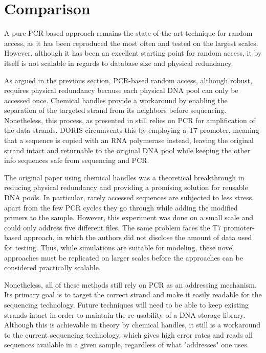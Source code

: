 \documentclass[a4paper,conference]{IEEEtran}
\begin{document}
\section{Comparison}
A pure PCR-based approach remains the state-of-the-art technique for random access, as it has been reproduced the most often and tested on the largest scales. However, although it has been an excellent starting point for random access, it by itself is not scalable in regards to database size and physical redundancy. 

As argued in the previous section, PCR-based random access, although robust, requires physical redundancy because each physical DNA pool can only be accessed once. Chemical handles provide a workaround by enabling the separation of the targeted strand from its neighbors before sequencing. Nonetheless, this process, as presented in \cite{chemicalhandles} still relies on PCR for amplification of the data strands. DORIS circumvents this by employing a T7 promoter, meaning that a sequence is copied with an RNA polymerase instead, leaving the original strand intact and returnable to the original DNA pool while keeping the other info sequences safe from sequencing and PCR.

The original paper using chemical handles was a theoretical breakthrough in reducing physical redundancy and providing a promising solution for reusable DNA pools. In particular, rarely accessed sequences are subjected to less stress, apart from the few PCR cycles they go through while adding the modified primers to the sample. However, this experiment was done on a small scale and could only address five different files. The same problem faces the T7 promoter-based approach, in which the authors did not disclose the amount of data used for testing. Thus, while simulations are suitable for modeling, these novel approaches must be replicated on larger scales before the approaches can be considered practically scalable. 

Nonetheless, all of these methods still rely on PCR as an addressing mechanism. Its primary goal is to target the correct strand and make it easily readable for the sequencing technology. Future techniques will need to be able to keep existing strands intact in order to maintain the re-usability of a DNA storage library. Although this is achievable in theory by chemical handles, it still is a workaround to the current sequencing technology, which gives high error rates and reads all sequences available in a given sample, regardless of what "addresses" one uses. 
\end{document}
